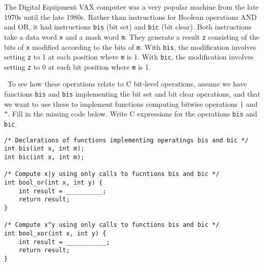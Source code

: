 \documentclass[12pt]{article}
\newenvironment{ex}[2][Exercise]{\begin{trivlist}
		\item[\hskip \labelsep {\bfseries #1}\hskip \labelsep {\bfseries #2.}]}{\end{trivlist}}
\begin{document}
\begin{ex}{2.13}
	The Digital Equipment VAX computer was a very popular machine from the late 1970s until
	the late 1980s. Rather than instructions for Boolean operations AND and OR, it had
	instructions \texttt{bis} (bit set) and \texttt{bic} (bit clear). Both instructions
	take a data word \texttt{x} and a mask word \texttt{m}. They generate a result
	\texttt{z} consisting of the bits of \texttt{x} modified according to the bits of
	\texttt{m}. With \texttt{bis}, the modification involves setting \texttt{z} to 1
	at each position where \texttt{m} is 1. With \texttt{bic}, the modification involves
	setting \texttt{z} to 0 at each bit position where \texttt{m} is 1.
	
	\
	To see how these operations relate to C bit-level operations, assume we have functions
	\texttt{bis} and \texttt{bis} implementing the bit set and bit clear operations, and
	that we want to use these to implement functions computing bitwise operations \texttt{|}
	and \texttt{\^}. Fill in the missing code below. Write C expressions for the operations
	\texttt{bis} and \texttt{bic}.
	
	\begin{lstlisting}
/* Declarations of functions implementing operatings bis and bic */
int bis(int x, int m);
int bic(int x, int m);

/* Compute x|y using only calls to fucntions bis and bic */
int bool_or(int x, int y) {
	int result = __________;
	return result;
}

/* Compute x^y using only calls to functions bis and bic */
int bool_xor(int x, int y) {
	int result = ___________;
	return result;
}
	\end{lstlisting}
\end{ex}
\end{document}
